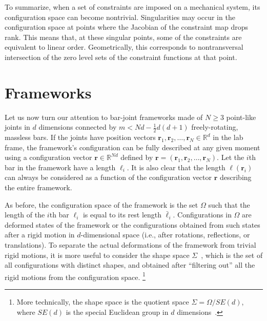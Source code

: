To summarize, when a set of constraints are imposed on a mechanical system, its configuration space can become nontrivial.
Singularities may occur in the configuration space at points where the Jacobian of the constraint map drops rank.
This means that, at these singular points, some of the constraints are equivalent to linear order.
Geometrically, this corresponds to nontransversal intersection of the zero level sets of the constraint functions at that point.

\section{Frameworks}
\label{sec:frameworks}

Let us now turn our attention to bar-joint frameworks made of $N \geq 3$ point-like joints in $d$ dimensions connected by $m < Nd - \tfrac{1}{2}d(d+1)$ freely-rotating, massless bars.
If the joints have position vectors $\bm{r}_1, \bm{r}_2, \ldots, \bm{r}_{N} \in \mathbb{R}^d$ in the lab frame, the framework's configuration can be fully described at any given moment using a configuration vector $\bm{r}\in\mathbb{R}^{N d}$ defined by $\bm{r} = (\bm{r}_1, \bm{r}_2, \ldots, \bm{r}_{N})$.
Let the $i$th bar in the framework have a length $\ell_{i}$.
It is also clear that the length $\ell(\bm{r}_{i})$ can always be considered as a function of the configuration vector $\bm{r}$ describing the entire framework.

As before, the configuration space of the framework is the set $\Omega$ such that the length of the $i$th bar $\ell_{i}$ is equal to its rest length $\bar{\ell}_{i}$.
Configurations in $\Omega$ are deformed states of the framework or the configurations obtained from such states after a rigid motion in $d$-dimensional space (i.e., after rotations, reflections, or translations).
To separate the actual deformations of the framework from trivial rigid motions, it is more useful to consider the shape space $\Sigma$~\cite{kendall1989,mezey1993,kendall1999}, which is the set of all configurations with distinct shapes, and
obtained after ``filtering out'' all the rigid motions from the configuration space.%
\footnote{More technically, the shape space is the quotient space $\Sigma = \Omega/SE(d)$, where $SE(d)$ is the special Euclidean group in $d$ dimensions~\cite{littlejohn1995}.}

